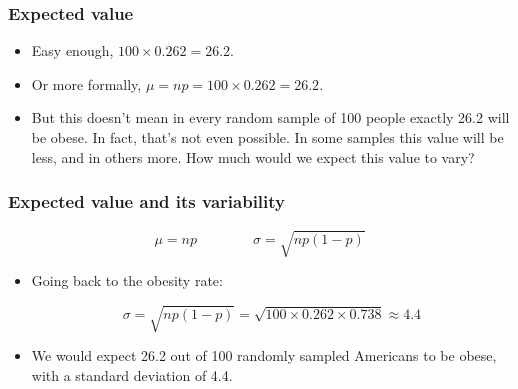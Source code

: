 \documentclass[slidestop,compress,mathserif]{beamer}
\begin{document}
\begin{frame}
\frametitle{Expected value}


\pause

\begin{itemize}

\item Easy enough, $100 \times 0.262 = 26.2$.

\pause

\item Or more formally, $\mu = np = 100 \times 0.262 = 26.2$.

\pause

\item But this doesn't mean in every random sample of 100 people exactly 26.2 will be obese. In fact, that's not even possible. In some samples this value will be less, and in others more. How much would we expect this value to vary?

\end{itemize}

\end{frame}


\begin{frame}
\frametitle{Expected value and its variability}

{\[ \mu = np \qquad \qquad \sigma = \sqrt{np(1-p)} \] }

\pause

\begin{itemize}

\item Going back to the obesity rate:

\[ \sigma = \sqrt{np(1-p)} = \sqrt{100 \times 0.262 \times 0.738} \approx  4.4\]

\pause

\item We would expect 26.2 out of 100 randomly sampled Americans to be obese, with a standard deviation of 4.4.

\end{itemize}


\end{frame}
\end{document}
